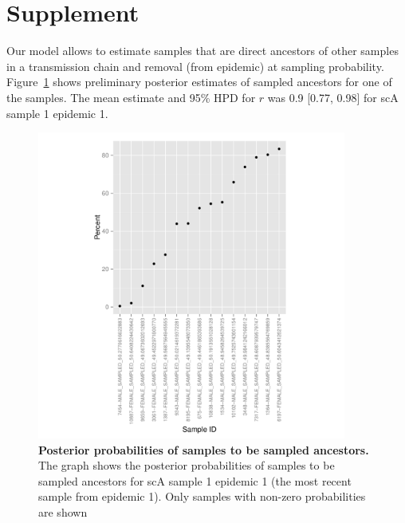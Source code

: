 \documentclass[11pt]{article}
\begin{document}
\section{Supplement}

Our model allows to estimate samples that are direct ancestors of other samples in a transmission chain and removal (from epidemic) at sampling probability. Figure~\ref{fig: SA} shows preliminary posterior estimates of sampled ancestors for one of the samples.  The mean estimate and 95\% HPD for $r$ was 0.9 [0.77, 0.98] for scA sample 1 epidemic 1. 

\begin{center} 
\begin{figure}[!h]
\includegraphics[width=4in]{sa_graph_scA}
\caption{\footnotesize {\bf Posterior probabilities of samples to be sampled ancestors.} 
The graph shows the posterior probabilities of samples to be sampled ancestors for scA sample 1 epidemic 1 (the most recent sample from epidemic 1). Only samples with non-zero probabilities are shown} 
\label{fig: SA} 
\end{figure}
\end{center} 
\end{document}
